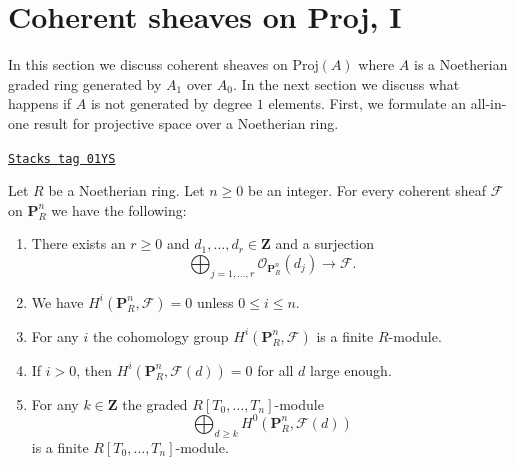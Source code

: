 \section{Coherent sheaves on Proj, I}
\label{coherent-section-coherent-proj}
In this section we discuss coherent sheaves on $\text{Proj}(A)$
where $A$ is a Noetherian graded ring generated by $A_1$ over $A_0$.
In the next section we discuss what happens if $A$ is not generated
by degree $1$ elements. First, we formulate an all-in-one result for
projective space over a Noetherian ring.

\begin{lemma}
\label{coherent-lemma-coherent-projective}
\href{https://stacks.math.columbia.edu/tag/01YS}{\texttt{Stacks tag 01YS}}

Let $R$ be a Noetherian ring.
Let $n \geq 0$ be an integer.
For every coherent sheaf $\mathcal{F}$ on $\mathbf{P}^n_R$
we have the following:
\begin{enumerate}
\item There exists an $r \geq 0$ and
$d_1, \ldots, d_r \in \mathbf{Z}$ and a surjection
$$
\bigoplus\nolimits_{j = 1, \ldots, r}
\mathcal{O}_{\mathbf{P}^n_R}(d_j)
\longrightarrow
\mathcal{F}.
$$
\item We have $H^i(\mathbf{P}^n_R, \mathcal{F}) = 0$ unless
$0 \leq i \leq n$.
\item For any $i$ the cohomology group $H^i(\mathbf{P}^n_R, \mathcal{F})$
is a finite $R$-module.
\item If $i > 0$, then
$H^i(\mathbf{P}^n_R, \mathcal{F}(d)) = 0$ for all $d$ large enough.
\item For any $k \in \mathbf{Z}$ the graded $R[T_0, \ldots, T_n]$-module
$$
\bigoplus\nolimits_{d \geq k} H^0(\mathbf{P}^n_R, \mathcal{F}(d))
$$
is a finite $R[T_0, \ldots, T_n]$-module.
\end{enumerate}
\end{lemma}

